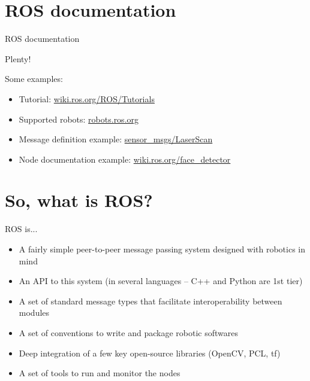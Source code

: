 \documentclass[compress]{beamer}
\begin{document}

\section[Doc]{ROS documentation}

\begin{frame}{ROS documentation}

Plenty!

Some examples:

\begin{itemize}
    \item Tutorial: \href{http://wiki.ros.org/ROS/Tutorials}{wiki.ros.org/ROS/Tutorials}
    \item Supported robots: \href{http://robots.ros.org/}{robots.ros.org}
    \item Message definition example:
        \href{http://docs.ros.org/api/sensor_msgs/html/msg/LaserScan.html}{sensor\_msgs/LaserScan}
    \item Node documentation example:
        \href{http://wiki.ros.org/face_detector}{wiki.ros.org/face\_detector}
\end{itemize}
\end{frame}

\section[So?]{So, what is ROS?}

\begin{frame}{ROS is...}
    \begin{itemize}
        \item<+-> A fairly simple peer-to-peer message passing system designed with robotics in
            mind
        \item<+-> An API to this system (in several languages -- C++ and Python are
            1st tier)
        \item<+-> A set of standard message types that facilitate interoperability between modules
        \item<+-> A set of conventions to write and package robotic softwares
        \item<+-> Deep integration of a few key open-source libraries (OpenCV, PCL, tf)
        \item<+-> A set of tools to run and monitor the nodes
    \end{itemize}
\end{frame}
\end{document}
